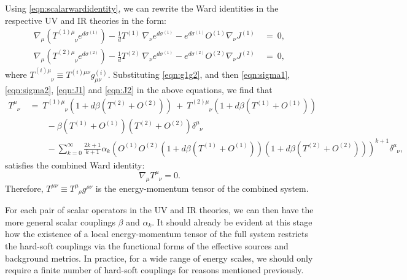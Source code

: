 \documentclass[prd,reprint,a4paper,showpacs,superscriptaddress,11pt,onecolumn,nofootinbib]{revtex4-1}
\renewcommand{\(}{\left(}
\renewcommand{\)}{\right)}
\newcommand{\6}{\partial}
\begin{document}
Using \eqref{eqn:scalarwardidentity}, we can rewrite the Ward identities in the respective UV and IR theories in the form:
\begin{align}
\nabla_\mu \left(T^{(1)\mu}_{\phantom{(1)\mu}\nu}e^{d\sigma^{(1)}}\right) - \frac{1}{d} T^{(1)} \, \nabla_\nu e^{d\sigma^{(1)}}-e^{d\sigma^{(1)}}O^{(1)} \nabla_\nu J^{(1)} ~ &= ~ 0, \nonumber\\
\nabla_\mu \left(T^{(2)\mu}_{\phantom{(2)\mu}\nu}e^{d\sigma^{(2)}}\right) - \frac{1}{d} T^{(2)} \, \nabla_\nu e^{d\sigma^{(1)}}-e^{d\sigma^{(2)}}O^{(2)} \nabla_\nu J^{(2)} ~ &= ~ 0,
\end{align}
where $T^{(i)\mu}_{\phantom{(i)\mu}\nu} \equiv T^{(i)\mu\nu}g^{(i)}_{\mu\nu}$. Substituting \eqref{eqn:g1g2}, and then \eqref{eqn:sigma1}, \eqref{eqn:sigma2}, \eqref{eqn:J1} and \eqref{eqn:J2} in the above equations, we find that
\begin{align}
T^{\mu}_{\phantom{\mu}\nu} ~ &= ~ T^{(1)\mu}_{\phantom{(1)\mu}\nu}\left(1 + d \beta \left(T^{(2)} + O^{(2)}\right)\right) ~ + ~ T^{(2)\mu}_{\phantom{(1)\mu}\nu}\left(1 + d \beta \left(T^{(1)} + O^{(1)}\right)\right) \nonumber\\ 
&\qquad - \beta\left(T^{(1)} + O^{(1)}\right)\left(T^{(2)} + O^{(2)}\right)\delta^{\mu}_{\phantom{\mu}\nu} \label{eqn:totalscalartmunu} \nonumber\\ 
&\qquad - \sum_{k= 0}^\infty\frac{2k+1}{k+1}\alpha_k \left(O^{(1)}O^{(2)}\left(1 +d \beta \left(T^{(1)} + O^{(1)}\right)\right)\left(1 +d \beta \left(T^{(2)} + O^{(2)}\right)\right)\right)^{k+1}\delta^{\mu}_{\phantom{\mu}\nu},
\end{align}
satisfies the combined Ward identity:
\begin{equation}\label{fullWI}
\nabla_\mu T^{\mu}_{\phantom{\mu}\nu} = 0.
\end{equation}
Therefore, $T^{\mu\nu} \equiv T^{\mu}_{\phantom{\mu}\rho} g^{\rho\nu}$ is the energy-momentum tensor of the combined system.

For each pair of scalar operators in the UV and IR theories, we can then have the more general scalar couplings $\beta$ and $\alpha_k$. It should already be evident at this stage how the existence of a local energy-momentum tensor of the full system restricts the hard-soft couplings via the functional forms of the effective sources and background metrics. In practice, for a wide range of energy scales, we should only require a finite number of hard-soft couplings for reasons mentioned previously.
\end{document}
